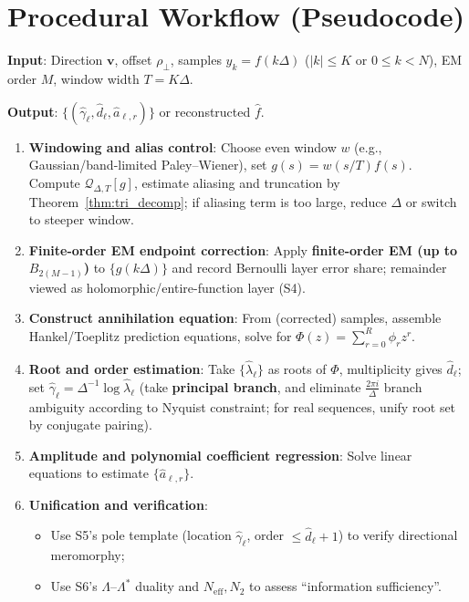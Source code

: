 \documentclass[11pt,a4paper]{article}
\theoremstyle{remark}
\begin{document}
\section{Procedural Workflow (Pseudocode)}

\textbf{Input}: Direction $\mathbf{v}$, offset $\rho_\perp$, samples $y_k=f(k\Delta)$ ($|k|\le K$ or $0\le k<N$), EM order $M$, window width $T=K\Delta$.

\textbf{Output}: $\{(\widehat{\gamma}_\ell,\widehat{d}_\ell,\widehat{a}_{\ell,r})\}$ or reconstructed $\widehat{f}$.

\begin{enumerate}
\item \textbf{Windowing and alias control}: Choose even window $w$ (e.g., Gaussian/band-limited Paley--Wiener), set $g(s)=w(s/T)f(s)$. Compute $\mathcal{Q}_{\Delta,T}[g]$, estimate aliasing and truncation by Theorem~\ref{thm:tri_decomp}; if aliasing term is too large, reduce $\Delta$ or switch to steeper window.

\item \textbf{Finite-order EM endpoint correction}: Apply \textbf{finite-order EM (up to $B_{2(M-1)}$)} to $\{g(k\Delta)\}$ and record Bernoulli layer error share; remainder viewed as holomorphic/entire-function layer (S4).

\item \textbf{Construct annihilation equation}: From (corrected) samples, assemble Hankel/Toeplitz prediction equations, solve for $\Phi(z)=\sum_{r=0}^{R}\phi_r z^r$.

\item \textbf{Root and order estimation}: Take $\{\widehat{\lambda}_\ell\}$ as roots of $\Phi$, multiplicity gives $\widehat{d}_\ell$; set $\widehat{\gamma}_\ell=\Delta^{-1}\log \widehat{\lambda}_\ell$ (take \textbf{principal branch}, and eliminate $\frac{2\pi i}{\Delta}$ branch ambiguity according to Nyquist constraint; for real sequences, unify root set by conjugate pairing).

\item \textbf{Amplitude and polynomial coefficient regression}: Solve linear equations to estimate $\{\widehat{a}_{\ell,r}\}$.

\item \textbf{Unification and verification}:
\begin{itemize}
\item Use S5's pole template (location $\widehat{\gamma}_\ell$, order $\le \widehat{d}_\ell+1$) to verify directional meromorphy;
\item Use S6's $\Lambda$--$\Lambda^\ast$ duality and $N_{\mathrm{eff}},N_2$ to assess ``information sufficiency''.
\end{itemize}
\end{enumerate}
\end{document}
